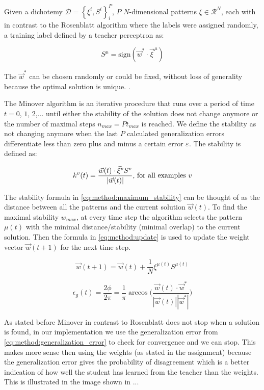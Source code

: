 Given a dichotemy $\mathcal{D} = \left\{\xi^i, S^i \right\}_{i}^{P}$, $P$ $N$-dimensional patterns $\xi \in \mathcal{R}^N$, each with in contrast to the Rosenblatt algorithm where the labels were assigned randomly, a training label defined by a teacher perceptron as:

\begin{equation}\label{eq:method:teacher_label}
	S^\mu = \text{sign}(\vec{w}^* \cdot {\vec{\xi}}^{\mu})
\end{equation}

The $\vec{w}^*$ can be chosen randomly or could be fixed, without loss of generality because the optimal solution is unique. .

The Minover algorithm is an iterative procedure that runs over a period of time $t = 0$, $1$, $2$,... until either the stability of the solution does not change anymore or the number of maximal steps $n_{max} = P t_{max}$ is reached. We define the stability as not changing anymore when the last $P$ calculated generalization errors differentiate less than zero plus and minus a certain error $\varepsilon$. The  stability is defined as: 

\begin{equation}\label{eq:method:maximum_stability}
\mathnormal{k}^v(t) = \frac{\vec{w}(t) \cdot \vec{\xi}^v S^v}{|\vec{w}(t)|} \text{, for all examples } v
\end{equation}

The stability formula in \eqref{eq:method:maximum_stability} can be thought of as the distance between all the patterns and the current solution $\vec{w}(t)$. To find the maximal stability $w_{max}$, at every time step the algorithm selects the pattern $\mu(t)$ with the minimal distance/stability (minimal overlap) to the current solution. Then the formula in \eqref{eq:method:update} is used to update the weight vector $\vec{w}(t + 1)$ for the next time step.

\begin{equation}\label{eq:method:update}
	\vec{w}(t + 1) = \vec{w}(t) + \frac{1}{N} \xi^{\mu(t)} S^{\mu(t)} 
\end{equation}

\begin{equation}\label{eq:method:generalization_error}
	\epsilon_g(t) = \frac{2\phi}{2\pi} =\frac{1}{\pi} \arccos \bigg(\frac{\vec{w}(t) \cdot \vec{w}^*}{|\vec{w}(t)| |\vec{w}^*|}\bigg)
\end{equation}

As stated before Minover in contrast to Rosenblatt does not stop when a solution is found, in our implementation we use the generalization error from \eqref{eq:method:generalization_error} to check for convergence and we can stop. This makes more sense then using the weights (as stated in the assignment) because the generalization error gives the probability of disagreement which is a better indication of how well the student has learned from the teacher than the weights. This is illustrated in the image shown in ...

